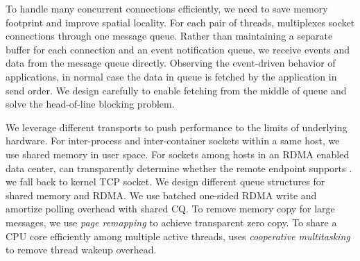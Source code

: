 To handle many concurrent connections efficiently, we need to save memory footprint and improve spatial locality.
For each pair of threads, \sys multiplexes socket connections through one message queue.
Rather than maintaining a separate buffer for each connection and an event notification queue, we receive events and data from the message queue directly.
Observing the event-driven behavior of applications, in normal case the data in queue is fetched by the application in send order.
We design carefully to enable fetching from the middle of queue and solve the head-of-line blocking problem.

We leverage different transports to push performance to the limits of underlying hardware.
For inter-process and inter-container sockets within a same host, we use shared memory in user space.
For sockets among hosts in an RDMA enabled data center, \sys can transparently determine whether the remote endpoint supports \sys.
we fall back to kernel TCP socket.
We design different queue structures for shared memory and RDMA.
We use batched one-sided RDMA write and amortize polling overhead with shared CQ.
To remove memory copy for large messages, we use \emph{page remapping} to achieve transparent zero copy.
To share a CPU core efficiently among multiple active threads, \sys uses \emph{cooperative multitasking} to remove thread wakeup overhead.

\fi



